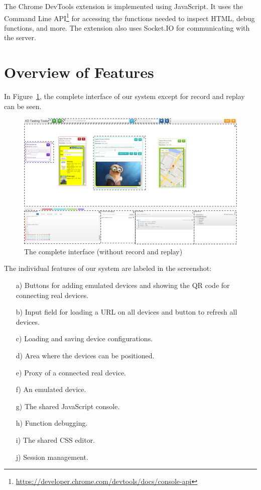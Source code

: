 The Chrome DevTools extension is implemented using JavaScript. It uses the Command Line API\footnote{\url{https://developer.chrome.com/devtools/docs/console-api}} for accessing the functions needed to inspect HTML, debug functions, and more. The extension also uses Socket.IO for  communicating with the server. 

\section{Overview of Features}

In Figure~\ref{fig:complete}, the complete interface of our system except for record and replay can be seen.

\begin{figure}[H]
  \centering
    \includegraphics[width=1.0\textwidth]{images/screenshots/complete_labeled.png}
	\caption[Screenshot: Complete Interface]{The complete interface (without record and replay)}
	\label{fig:complete}
\end{figure}

The individual features of our system are labeled in the screenshot:
\begin{itemize}
	\item [a)] Buttons for adding emulated devices and showing the QR code for connecting real devices.
	\item [b)] Input field for loading a URL on all devices and button to refresh all devices.
	\item [c)] Loading and saving device configurations.
	\item [d)] Area where the devices can be positioned.
	\item [e)] Proxy of a connected real device.
	\item [f)] An emulated device.
	\item [g)] The shared JavaScript console.
	\item [h)] Function debugging.
	\item [i)] The shared CSS editor.
	\item [j)] Session management.
\end{itemize}

